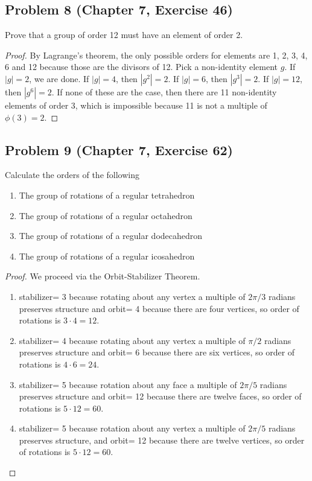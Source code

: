 \documentclass{article}
\begin{document}
\subsection*{Problem 8 (Chapter 7, Exercise 46)}
Prove that a group of order 12 must have an element of order 2.
\begin{proof}
By Lagrange's theorem, the only possible orders for elements are 1, 2, 3, 4, 6 and 12 because those are the divisors of 12. Pick a non-identity element $g$. If $|g| = 2$, we are done. If $|g| = 4$, then $|g^2| = 2$. If $|g| = 6$, then $|g^3| = 2$. If $|g| = 12$, then $|g^6| = 2$. If none of these are the case, then there are 11 non-identity elements of order 3, which is impossible because 11 is not a multiple of $\phi(3) = 2$.
\end{proof}

\subsection*{Problem 9 (Chapter 7, Exercise 62)}
Calculate the orders of the following
\begin{enumerate}[label=\alph*.]
\item The group of rotations of a regular tetrahedron 
\item The group of rotations of a regular octahedron
\item The group of rotations of a regular dodecahedron
\item The group of rotations of a regular icosahedron
\end{enumerate}
\begin{proof}
We proceed via the Orbit-Stabilizer Theorem.
\begin{enumerate}[label=\alph*.]
\item \textbar stabilizer\textbar = 3 because rotating about any vertex a multiple of $2\pi/3$ radians preserves structure and \textbar orbit\textbar = 4 because there are four vertices, so order of rotations is $3 \cdot 4 = 12$. 
\item \textbar stabilizer\textbar = 4 because rotating about any vertex a multiple of $\pi/2$ radians preserves structure and \textbar orbit\textbar = 6 because there are six vertices, so order of rotations is $4 \cdot 6 = 24$.
\item \textbar stabilizer\textbar = 5 because rotation about any face a multiple of $2\pi/5$ radians preserves structure and \textbar orbit\textbar = 12 because there are twelve faces, so order of rotations is $5 \cdot 12 = 60$.
\item \textbar stabilizer\textbar = 5 because rotation about any vertex a multiple of $2\pi/5$ radians preserves structure, and \textbar orbit\textbar = 12 because there are twelve vertices, so order of rotations is $5 \cdot 12 = 60$.
\end{enumerate}
\end{proof}
\end{document}
